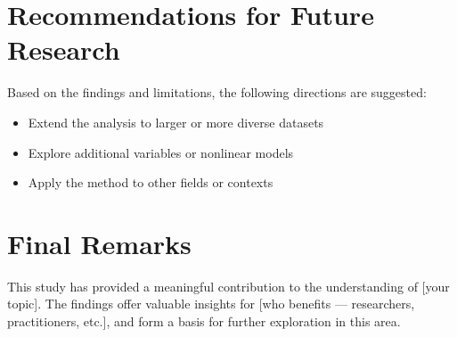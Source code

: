 \section{Recommendations for Future Research}
Based on the findings and limitations, the following directions are suggested:
\begin{itemize}
    \item Extend the analysis to larger or more diverse datasets
    \item Explore additional variables or nonlinear models
    \item Apply the method to other fields or contexts
\end{itemize}

\section{Final Remarks}
This study has provided a meaningful contribution to the understanding of [your topic]. The findings offer valuable insights for [who benefits — researchers, practitioners, etc.], and form a basis for further exploration in this area.